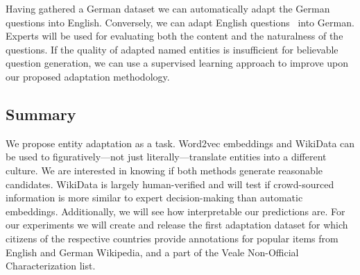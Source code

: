 Having gathered a German dataset we can automatically adapt the German questions into English.  
%
Conversely, we can adapt English questions~\citep{rajpurkar-16} into German.  
%
Experts will be used for evaluating both the content and the naturalness of the questions.  
%
If the quality of adapted named entities is insufficient for believable question generation, we can use a supervised learning approach to improve upon our proposed adaptation methodology.  

\subsection{Summary}


We propose entity adaptation as a task.
%
Word2vec embeddings and WikiData can be used to figuratively---not just literally---translate entities into a different culture.   
%
We are interested in knowing if both methods generate reasonable candidates. 
%
WikiData is largely human-verified and will test if crowd-sourced information is more similar to expert decision-making than automatic embeddings.  
%
Additionally, we will see how interpretable our predictions are.  
%
For our experiments we will create and release the first adaptation dataset for which citizens of the respective countries provide annotations for popular items from English and German Wikipedia, and a part of the Veale Non-Official Characterization list.
%

